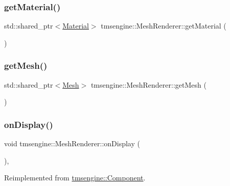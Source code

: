 \subsubsection{\texorpdfstring{get\+Material()}{getMaterial()}}
{\footnotesize\ttfamily std\+::shared\+\_\+ptr$<$\hyperlink{class_material}{Material}$>$ tmsengine\+::\+Mesh\+Renderer\+::get\+Material (\begin{DoxyParamCaption}{ }\end{DoxyParamCaption})}

\mbox{\label{classtmsengine_1_1_mesh_renderer_a8f4724f163a3ff6e0eba9508380f79f1}} 
\subsubsection{\texorpdfstring{get\+Mesh()}{getMesh()}}
{\footnotesize\ttfamily std\+::shared\+\_\+ptr$<$\hyperlink{class_mesh}{Mesh}$>$ tmsengine\+::\+Mesh\+Renderer\+::get\+Mesh (\begin{DoxyParamCaption}{ }\end{DoxyParamCaption})}

\mbox{\label{classtmsengine_1_1_mesh_renderer_adf77a2164ad1c92e4a310b99624b9fb5}} 
\subsubsection{\texorpdfstring{on\+Display()}{onDisplay()}}
{\footnotesize\ttfamily void tmsengine\+::\+Mesh\+Renderer\+::on\+Display (\begin{DoxyParamCaption}{ }\end{DoxyParamCaption})\hspace{0.3cm}{\ttfamily [private]}, {\ttfamily [virtual]}}



Reimplemented from \hyperlink{classtmsengine_1_1_component_a73aa3564db299ef43100bd58d7cab65b}{tmsengine\+::\+Component}.

